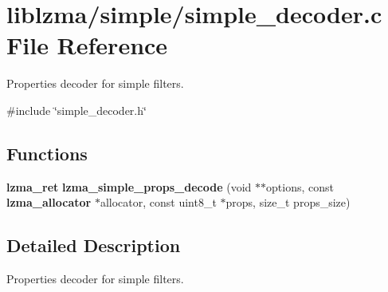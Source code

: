\section{liblzma/simple/simple\+\_\+decoder.c File Reference}
\label{simple__decoder_8c}


Properties decoder for simple filters.  


{\ttfamily \#include \char`\"{}simple\+\_\+decoder.\+h\char`\"{}}\newline
\subsection*{Functions}
\begin{DoxyCompactItemize}
\item 
\mbox{\label{simple__decoder_8c_ae439ee0abc0a7b2d28d1be83b449d3e4}} 
\textbf{ lzma\+\_\+ret} {\bfseries lzma\+\_\+simple\+\_\+props\+\_\+decode} (void $\ast$$\ast$options, const \textbf{ lzma\+\_\+allocator} $\ast$allocator, const uint8\+\_\+t $\ast$props, size\+\_\+t props\+\_\+size)
\end{DoxyCompactItemize}


\subsection{Detailed Description}
Properties decoder for simple filters. 

